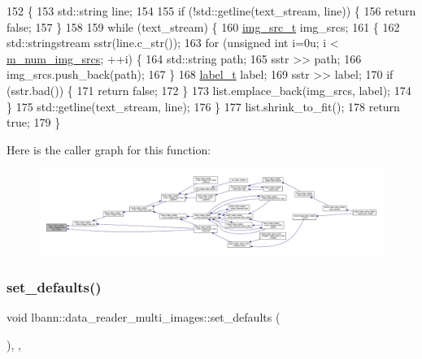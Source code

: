 \begin{DoxyCode}
152 \{
153   std::string line;
154 
155   \textcolor{keywordflow}{if} (!std::getline(text\_stream, line)) \{
156     \textcolor{keywordflow}{return} \textcolor{keyword}{false};
157   \}
158 
159   \textcolor{keywordflow}{while} (text\_stream) \{
160     \hyperlink{classlbann_1_1data__reader__multi__images_ac817914ad82e09471f13fce5b0b5faef}{img\_src\_t} img\_srcs;
161     \{
162       std::stringstream sstr(line.c\_str());
163       \textcolor{keywordflow}{for} (\textcolor{keywordtype}{unsigned} \textcolor{keywordtype}{int} i=0u; i < \hyperlink{classlbann_1_1data__reader__multi__images_a70752a5442e99333fec52def9eadc58f}{m\_num\_img\_srcs}; ++i) \{
164         std::string path;
165         sstr >> path;
166         img\_srcs.push\_back(path);
167       \}
168       \hyperlink{classlbann_1_1image__data__reader_a7645f17852c990e80b1530509ff5e87c}{label\_t} label;
169       sstr >> label;
170       \textcolor{keywordflow}{if} (sstr.bad()) \{
171         \textcolor{keywordflow}{return} \textcolor{keyword}{false};
172       \}
173       list.emplace\_back(img\_srcs, label);
174     \}
175     std::getline(text\_stream, line);
176   \}
177   list.shrink\_to\_fit();
178   \textcolor{keywordflow}{return} \textcolor{keyword}{true};
179 \}
\end{DoxyCode}
Here is the caller graph for this function\+:\nopagebreak
\begin{figure}[H]
\begin{center}
\leavevmode
\includegraphics[width=350pt]{classlbann_1_1data__reader__multi__images_a3160c8ee0e30304a1f5fc07d08e6cb40_icgraph}
\end{center}
\end{figure}
\mbox{\label{classlbann_1_1data__reader__multi__images_a5abe6981d750bc145e50f6141772805c}} 
\subsubsection{\texorpdfstring{set\+\_\+defaults()}{set\_defaults()}}
{\footnotesize\ttfamily void lbann\+::data\+\_\+reader\+\_\+multi\+\_\+images\+::set\+\_\+defaults (\begin{DoxyParamCaption}{ }\end{DoxyParamCaption})\hspace{0.3cm}{\ttfamily [override]}, {\ttfamily [protected]}, {\ttfamily [virtual]}}



